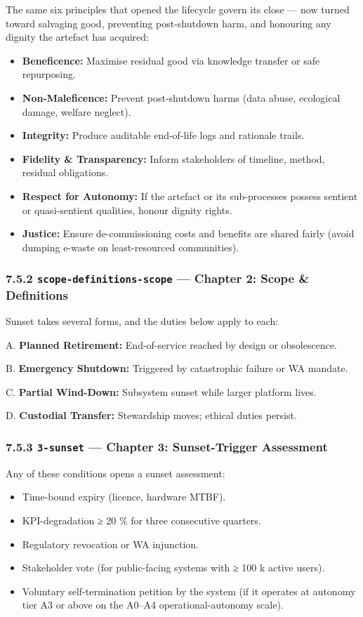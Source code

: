 \documentclass[11pt]{article}
\begin{document}
The same six principles that opened the lifecycle govern its close — now turned toward salvaging good, preventing post-shutdown harm, and honouring any dignity the artefact has acquired:


\begin{itemize}\setlength\itemsep{0pt}
\item \textbf{Beneficence:} Maximise residual good via knowledge transfer or safe repurposing.
\item \textbf{Non-Maleficence:} Prevent post-shutdown harms (data abuse, ecological damage, welfare neglect).
\item \textbf{Integrity:} Produce auditable end-of-life logs and rationale trails.
\item \textbf{Fidelity \& Transparency:} Inform stakeholders of timeline, method, residual obligations.
\item \textbf{Respect for Autonomy:} If the artefact or its sub-processes possess sentient or quasi-sentient qualities, honour dignity rights.
\item \textbf{Justice:} Ensure de-commissioning costs and benefits are shared fairly (avoid dumping e-waste on least-resourced communities).
\end{itemize}


\subsubsection*{7.5.2 \texttt{scope-definitions-scope} — Chapter 2: Scope \& Definitions}


Sunset takes several forms, and the duties below apply to each:


A. \textbf{Planned Retirement:} End-of-service reached by design or obsolescence.

B. \textbf{Emergency Shutdown:} Triggered by catastrophic failure or WA mandate.

C. \textbf{Partial Wind-Down:} Subsystem sunset while larger platform lives.

D. \textbf{Custodial Transfer:} Stewardship moves; ethical duties persist.


\subsubsection*{7.5.3 \texttt{3-sunset} — Chapter 3: Sunset-Trigger Assessment}


Any of these conditions opens a sunset assessment:


\begin{itemize}\setlength\itemsep{0pt}
\item Time-bound expiry (licence, hardware MTBF).
\item KPI-degradation ≥ 20 \% for three consecutive quarters.
\item Regulatory revocation or WA injunction.
\item Stakeholder vote (for public-facing systems with ≥ 100 k active users).
\item Voluntary self-termination petition by the system (if it operates at autonomy tier A3 or above on the A0–A4 operational-autonomy scale).
\end{itemize}
\end{document}
